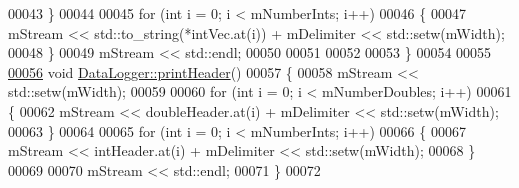 \begin{DoxyCode}
00043     \}
00044 
00045     \textcolor{keywordflow}{for} (\textcolor{keywordtype}{int} i = 0; i < mNumberInts; i++)
00046     \{
00047         mStream << std::to\_string(*intVec.at(i)) + mDelimiter << std::setw(mWidth);
00048     \}
00049     mStream << std::endl;
00050 
00051 
00052     
00053 \}
00054 
00055 
\hyperlink{group___tools_ad7247b2350411b48f323de6c91e8479c}{00056} \textcolor{keywordtype}{void} \hyperlink{group___tools_ad7247b2350411b48f323de6c91e8479c}{DataLogger::printHeader}()
00057 \{
00058     mStream << std::setw(mWidth);
00059 
00060     \textcolor{keywordflow}{for} (\textcolor{keywordtype}{int} i = 0; i < mNumberDoubles; i++)
00061     \{
00062         mStream << doubleHeader.at(i) + mDelimiter << std::setw(mWidth);
00063     \}
00064 
00065     \textcolor{keywordflow}{for} (\textcolor{keywordtype}{int} i = 0; i < mNumberInts; i++)
00066     \{
00067         mStream << intHeader.at(i) + mDelimiter << std::setw(mWidth);
00068     \}
00069 
00070     mStream << std::endl;
00071 \}
00072 
\end{DoxyCode}
